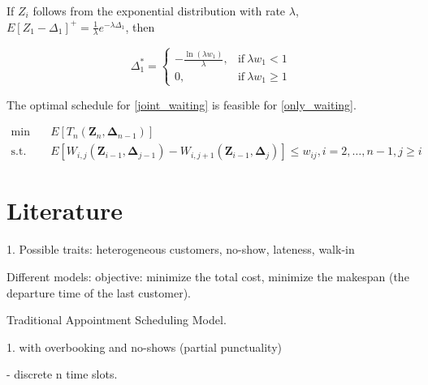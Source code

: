 \documentclass{article}
\newcommand{\Z}{\mathbf{Z}}
\newcommand{\D}{\bm{\Delta}}
\begin{document}
If $Z_{i}$ follows from the exponential distribution with rate $\lambda$, $E\left[Z_{1}- \Delta_{1} \right]^{+} = \frac{1}{\lambda} e^{-\lambda \Delta_{1}}$, then

\begin{equation*}
	\Delta_{1}^{*} = \begin{cases}
	-\frac{\ln (\lambda w_{1})}{\lambda}, & \text{if}~ \lambda w_{1} < 1 \\
	0, & \text{if}~ \lambda w_{1} \geq 1	
	\end{cases}
\end{equation*}

\vspace{10cm}

The optimal schedule for \eqref{joint_waiting} is feasible for \eqref{only_waiting}.

\begin{equation}\label{only_waiting}
    \begin{aligned}
        \min \quad & E \left[T_n(\Z_{n}, \D_{n-1}) \right] \\
        \mbox{s.t.} \quad & E\left[W_{i,j}(\Z_{i-1}, \D_{j-1})-W_{i,j+1}(\Z_{i-1}, \D_{j}) \right] \leq w_{ij}, i =2, \ldots, n-1, j \geq i
    \end{aligned}
\end{equation}





\newpage


\section{Literature}

1. Possible traits: heterogeneous customers, no-show, lateness, walk-in

Different models: objective: minimize the total cost, minimize the makespan (the departure time of the last customer).


Traditional Appointment Scheduling Model.

1. with overbooking and no-shows (partial punctuality)

- discrete n time slots.
\end{document}
